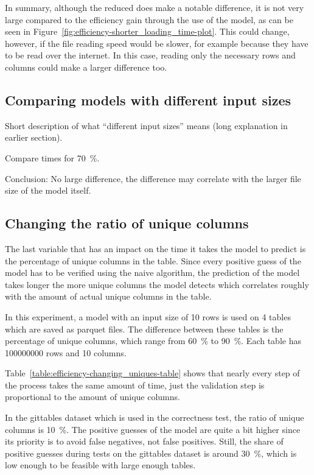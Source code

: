 In summary, although the reduced \io{} does make a notable difference, it is not very large compared to the efficiency gain through the use of the model, as can be seen in Figure~\ref{fig:efficiency-shorter_loading_time-plot}. This could change, however, if the file reading speed would be slower, for example because they have to be read over the internet. In this case, reading only the necessary rows and columns could make a larger difference too.




\subsection{Comparing models with different input sizes}\label{subsec:efficiency-comparing_models} %
Short description of what \enquote{different input sizes} means (long explanation in earlier section).

Compare times for \SI{70}{\percent}.

Conclusion: No large difference, the difference may correlate with the larger file size of the model itself.


\subsection{Changing the ratio of unique columns}\label{subsec:efficiency-changing_uniques}
The last variable that has an impact on the time it takes the model to predict is the percentage of unique columns in the table. Since every positive guess of the model has to be verified using the naive algorithm, the prediction of the model takes longer the more unique columns the model detects which correlates roughly with the amount of actual unique columns in the table. %

In this experiment, a model with an input size of 10 rows is used on 4 tables which are saved as parquet files. The difference between these tables is the percentage of unique columns, which range from \SI{60}{\percent} to \SI{90}{\percent}. Each table has \num{100000000} rows and \num{10} columns.

Table~\ref{table:efficiency-changing_uniques-table} shows that nearly every step of the process takes the same amount of time, just the validation step is proportional to the amount of unique columns.

In the gittables dataset which is used in the correctness test, the ratio of unique columns is \SI{10}{\percent}. The positive guesses of the model are quite a bit higher since its priority is to avoid false negatives, not false positives. Still, the share of positive guesses during tests on the gittables dataset is around \SI{30}{\percent}, which is low enough to be feasible with large enough tables. %


